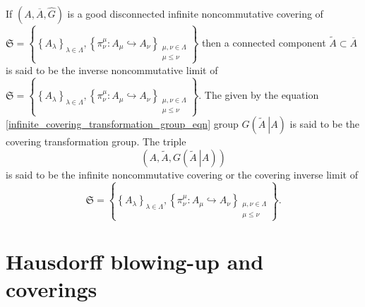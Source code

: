\documentclass{beamer}
\theoremstyle{plain}
\newcommand{\be}{\begin{equation}}
\newcommand{\ee}{\end{equation}}
\newcommand{\la}{\lambda}
\newcommand{\La}{\Lambda}
\newcommand{\hookto}{\hookrightarrow}        %
\begin{document}
	\begin{frame}
	 
	\begin{definition}\label{infinite_noncommutative_covering_defn}
		If $\left(A, \overline{A},\widehat{G}\right)$ is a good  disconnected infinite noncommutative covering of $\mathfrak{S}=\left\{\left\{A_\la\right\}_{\la\in \La}, \left\{\pi^\mu_\nu : A_\mu \hookto A_\nu\right\}_{\substack{\mu, \nu \in \La\\\mu \le \nu}}\right\}$  then a connected component $\widetilde{A} \subset \overline{A}$ is said to be the \alert{inverse noncommutative limit of $\mathfrak{S}=\left\{\left\{A_\la\right\}_{\la\in \La}, \left\{\pi^\mu_\nu : A_\mu \hookto A_\nu\right\}_{\substack{\mu, \nu \in \La\\\mu \le \nu}}\right\}$}. The given by the equation \eqref{infinite_covering_transformation_group_eqn} group $G\left(\left.\widetilde{A}~\right| A\right)$  is said to be the \alert{covering transformation group}.  The triple
		\be\label{infinite_noncommutative_covering_eqn}
		\left(A, \widetilde{A}, G\left(\left.\widetilde{A}~\right| A\right)\right)
		\ee
		is said to be the  \alert{infinite noncommutative covering} or the  \alert{covering inverse  limit} of  $$\mathfrak{S}=\left\{\left\{A_\la\right\}_{\la\in \La}, \left\{\pi^\mu_\nu : A_\mu \hookto A_\nu\right\}_{\substack{\mu, \nu \in \La\\\mu \le \nu}}\right\}.$$ 
	\end{definition}

	\end{frame}
\section{Hausdorff blowing-up and coverings}
\end{document}

